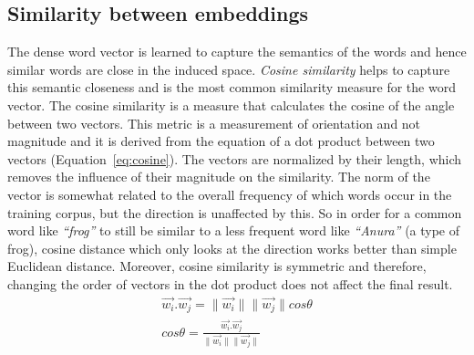 \subsection{Similarity between embeddings}\label{sec:similarity}
The dense word vector is learned to capture the semantics of the words and hence similar words are close in the induced space. \emph{Cosine similarity} helps to capture this semantic closeness and is the most common similarity measure for the word vector. The cosine similarity is a measure that calculates the cosine of the angle between two vectors. This metric is a measurement of orientation and not magnitude and it is derived from the equation of a dot product between two vectors (Equation~\ref{eq:cosine}). The vectors are normalized by their length, which removes the influence of their magnitude on the similarity. The norm of the vector is somewhat related to the overall frequency of which words occur in the training corpus, but the direction is unaffected by this. So in order for a common word like \emph{``frog''} to still be similar to a less frequent word like \emph{``Anura''} (a type of frog), cosine distance which only looks at the direction works better than simple Euclidean distance. Moreover, cosine similarity is symmetric and therefore, changing the order of vectors in the dot product does not affect the final result.
\begin{equation}
\begin{split}
\overrightarrow { w_i } .\overrightarrow { w_j } =\parallel \overrightarrow { w_i } \parallel \parallel \overrightarrow { w_j } \parallel cos\theta 
\\
cos\theta =\frac { \overrightarrow { w_i } .\overrightarrow { w_j }  }{ \parallel \overrightarrow { w_i } \parallel \parallel \overrightarrow { w_j } \parallel  } 
\end{split}
\label{eq:cosine}
\end{equation}
